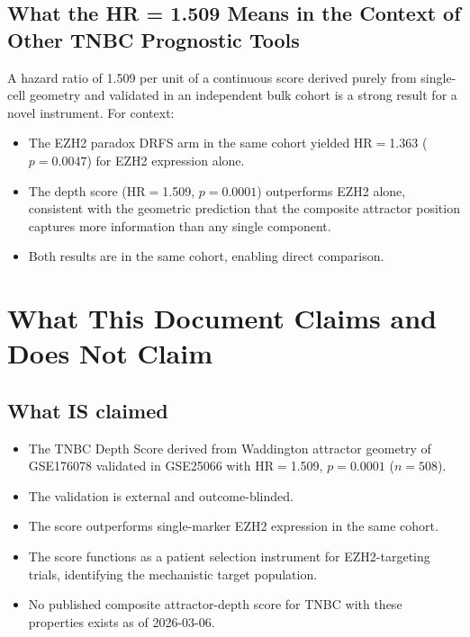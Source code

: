 \documentclass[12pt, a4paper]{article}
\begin{document}
\subsection{What the HR = 1.509 Means in
the Context of Other TNBC Prognostic Tools}

A hazard ratio of 1.509 per unit of a continuous
score derived purely from single-cell geometry
and validated in an independent bulk cohort is
a strong result for a novel instrument.
For context:

\begin{itemize}
    \item The EZH2 paradox DRFS arm in the same
    cohort yielded HR$=$1.363 ($p=0.0047$) for
    EZH2 expression alone.
    \item The depth score (HR$=$1.509,
    $p=0.0001$) outperforms EZH2 alone,
    consistent with the geometric prediction
    that the composite attractor position
    captures more information than any single
    component.
    \item Both results are in the same cohort,
    enabling direct comparison.
\end{itemize}

\section{What This Document Claims and Does
Not Claim}

\subsection{What IS claimed}

\begin{itemize}
    \item The TNBC Depth Score derived from
    Waddington attractor geometry of GSE176078
    validated in GSE25066 with
    HR$=$1.509, $p=0.0001$ ($n=508$).
    \item The validation is external and
    outcome-blinded.
    \item The score outperforms single-marker
    EZH2 expression in the same cohort.
    \item The score functions as a patient
    selection instrument for EZH2-targeting
    trials, identifying the mechanistic
    target population.
    \item No published composite attractor-depth
    score for TNBC with these properties exists
    as of 2026-03-06.
\end{itemize}
\end{document}

